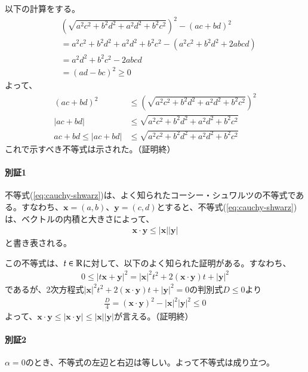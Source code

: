 以下の計算をする。
\begin{align}
    &\left(\sqrt{a^2c^2+b^2d^2+a^2d^2+b^2c^2}\right)^2-(ac+bd)^2\nonumber\\
    &=a^2c^2+b^2d^2+a^2d^2+b^2c^2-(a^2c^2+b^2d^2+2abcd)\nonumber\\
    &=a^2d^2+b^2c^2-2abcd\nonumber\\
    &=(ad-bc)^2\ge0\label{eq:togo}
\end{align}
よって、
\begin{align*}
    (ac+bd)^2&\le\left(\sqrt{a^2c^2+b^2d^2+a^2d^2+b^2c^2}\right)^2\\
    |ac+bd|&\le\sqrt{a^2c^2+b^2d^2+a^2d^2+b^2c^2}\\
    ac+bd\le|ac+bd|&\le\sqrt{a^2c^2+b^2d^2+a^2d^2+b^2c^2}
\end{align*}
これで示すべき不等式は示された。（証明終）

\paragraph{別証1}
不等式(\ref{eq:cauchy-shwarz})は、よく知られたコーシー・シュワルツの不等式である。すなわち、$\bm{x}=(a,b)$、$\bm{y}=(c,d)$とすると、不等式(\ref{eq:cauchy-shwarz})は、ベクトルの内積と大きさによって、
\begin{align}
    \bm{x}\cdot \bm{y}\le|\bm{x}||\bm{y}|\label{eq:cauchy-shwarz0}
\end{align}
と書き表される。

この不等式は、$t\in\mathbb{R}$に対して、以下のよく知られた証明がある。すなわち、
\begin{align*}
    0\le|t\bm{x}+\bm{y}|^2
    =|\bm{x}|^2t^2+2(\bm{x}\cdot\bm{y})t+|\bm{y}|^2
\end{align*}
であるが、2次方程式$|\bm{x}|^2t^2+2(\bm{x}\cdot\bm{y})t+|\bm{y}|^2=0$の判別式$D\le 0$より
\begin{align*}
    \frac{D}{4}=(\bm{x}\cdot\bm{y})^2-|\bm{x}|^2|\bm{y}|^2\le 0
\end{align*}
よって、$\bm{x}\cdot\bm{y}\le|\bm{x}\cdot\bm{y}|\le|\bm{x}||\bm{y}|$が言える。（証明終）

\paragraph{別証2}
$\alpha=0$のとき、不等式の左辺と右辺は等しい。よって不等式は成り立つ。

